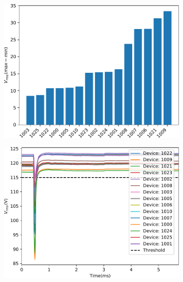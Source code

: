 \begin{figure}[ht!]
    \centering
    \begin{subfigure}{0.49\textwidth}
        \centering
        \includegraphics[width=1\linewidth]{img/napali_eval/subthreshold/clustering/318273.pdf}
    \end{subfigure}%
    \begin{subfigure}{0.49\textwidth}
        \centering
        \includegraphics[width=1\linewidth]{img/napali_eval/subthreshold/clustering/318273_data.pdf}
    \end{subfigure}
    \begin{subfigure}{0.49\textwidth}
        \centering

\end{subfigure}
\end{figure}
